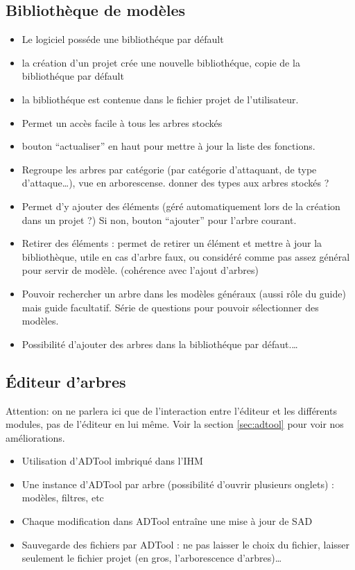 	\subsection{Bibliothèque de modèles}

		\begin{itemize}
			\item Le logiciel posséde une bibliothéque par défault
			\item la création d'un projet crée une nouvelle bibliothéque, copie de la bibliothéque par défault
			\item la bibliothéque est contenue dans le fichier projet de l'utilisateur. 
			\item Permet un accès facile à tous les arbres stockés
			\item bouton “actualiser” en haut pour mettre à jour la liste des fonctions.
			\item Regroupe les arbres par catégorie (par catégorie d’attaquant, de type d’attaque…), vue en arborescense. 	donner des types aux arbres stockés ?
			\item Permet d’y ajouter des éléments (géré automatiquement lors de la création dans un projet ?) Si non, bouton “ajouter” pour l’arbre courant. 
			\item Retirer des éléments : permet de retirer un élément et mettre à jour la bibliothèque, utile en cas d’arbre faux, ou considéré comme pas assez général pour servir de modèle. (cohérence avec l’ajout d’arbres)
			\item Pouvoir rechercher un arbre dans les modèles généraux (aussi rôle du guide) mais guide facultatif. Série de questions pour pouvoir sélectionner des modèles.
			\item Possibilité d'ajouter des arbres dans la bibliothéque par défaut.\ldots
		\end{itemize}
		

	\subsection{Éditeur d'arbres}

		Attention: on ne parlera ici que de l'interaction entre l'éditeur et les différents modules, pas de l'éditeur en lui même.
		Voir la section \ref{sec:adtool} pour voir nos améliorations.

		\begin{itemize}
			\item  Utilisation d'ADTool imbriqué dans l'IHM
			\item Une instance d'ADTool par arbre (possibilité d'ouvrir plusieurs onglets) : modèles, filtres, etc
			\item Chaque modification dans ADTool entraîne une mise à jour de SAD
			\item Sauvegarde des fichiers par ADTool : ne pas laisser le choix du fichier, laisser seulement le fichier projet (en gros, l'arborescence d'arbres)\ldots
		\end{itemize}


